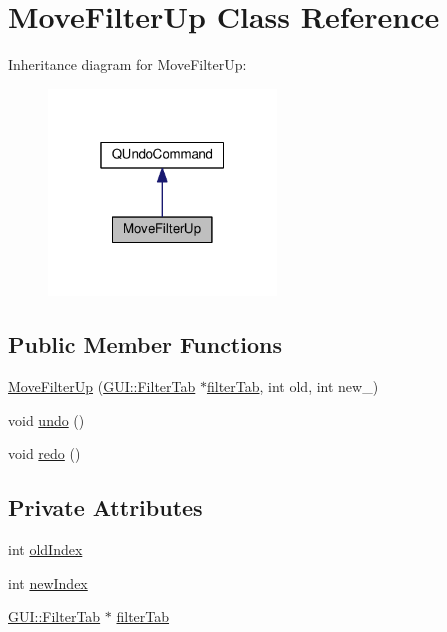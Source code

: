 \hypertarget{classUndoRedo_1_1MoveFilterUp}{}\section{Move\+Filter\+Up Class Reference}
\label{classUndoRedo_1_1MoveFilterUp}


Inheritance diagram for Move\+Filter\+Up\+:
\nopagebreak
\begin{figure}[H]
\begin{center}
\leavevmode
\includegraphics[width=172pt]{classUndoRedo_1_1MoveFilterUp__inherit__graph}
\end{center}
\end{figure}
\subsection*{Public Member Functions}
\begin{DoxyCompactItemize}
\item 
\hyperlink{classUndoRedo_1_1MoveFilterUp_ad11948fd1a203013d312b05633a01941}{Move\+Filter\+Up} (\hyperlink{classGUI_1_1FilterTab}{G\+U\+I\+::\+Filter\+Tab} $\ast$\hyperlink{classUndoRedo_1_1MoveFilterUp_a47ca82534a740774d79998759818d9f4}{filter\+Tab}, int old, int new\+\_)
\item 
void \hyperlink{classUndoRedo_1_1MoveFilterUp_a0e1e7804a53f6d62efc72c9bdbec8571}{undo} ()
\item 
void \hyperlink{classUndoRedo_1_1MoveFilterUp_a93c48d6ed036e1a381be53ac67643284}{redo} ()
\end{DoxyCompactItemize}
\subsection*{Private Attributes}
\begin{DoxyCompactItemize}
\item 
int \hyperlink{classUndoRedo_1_1MoveFilterUp_aafdfcd92ee5fcb81a8ce268be0f53466}{old\+Index}
\item 
int \hyperlink{classUndoRedo_1_1MoveFilterUp_a12457b7d335917daf42dba277962d6b2}{new\+Index}
\item 
\hyperlink{classGUI_1_1FilterTab}{G\+U\+I\+::\+Filter\+Tab} $\ast$ \hyperlink{classUndoRedo_1_1MoveFilterUp_a47ca82534a740774d79998759818d9f4}{filter\+Tab}
\end{DoxyCompactItemize}


